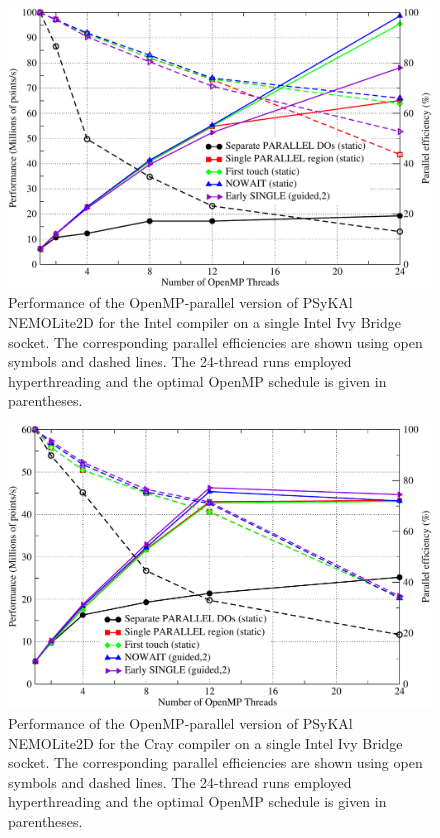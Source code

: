 \documentclass[gmdd, manuscript]{copernicus}
\newlength{\picwidth}
\begin{document}
\begin{figure}
\centering
\includegraphics[width=\picwidth]{omp_scaling_256_intel}
\caption{Performance of the OpenMP-parallel version of {PS}y{KA}l
  NEMOLite2D for the Intel compiler on a single Intel Ivy Bridge
  socket.  The corresponding parallel efficiencies are shown using
  open symbols and dashed lines. The 24-thread runs employed
  hyperthreading and the optimal OpenMP schedule is given in
  parentheses.}
\label{FIG_intel_omp_256}
\end{figure}

\begin{figure}
\centering
\includegraphics[width=\picwidth]{omp_scaling_256_cray}
\caption{Performance of the OpenMP-parallel version of {PS}y{KA}l
  NEMOLite2D for the Cray compiler on a single Intel Ivy Bridge
  socket.  The corresponding parallel efficiencies are shown using
  open symbols and dashed lines. The 24-thread runs employed
  hyperthreading and the optimal OpenMP schedule is given in
  parentheses.}
\label{FIG_cray_omp_256}
\end{figure}
\end{document}
